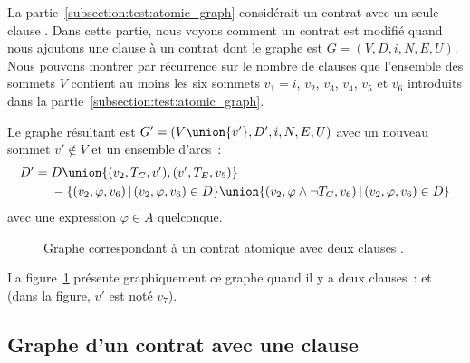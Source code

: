 La partie~\ref{subsection:test:atomic_graph} considérait un contrat avec un
seule clause \athrowable. Dans cette partie, nous voyons comment un contrat est
modifié quand nous ajoutons une clause  à un
contrat dont le graphe est $G = (V, D, i, N, E, U)$. Nous pouvons montrer par
récurrence sur le nombre de clauses \athrowable que l'ensemble des sommets $V$
contient au moins les six sommets $v_1 = i$, $v_2$, $v_3$, $v_4$, $v_5$ et $v_6$
introduits dans la partie~\ref{subsection:test:atomic_graph}.

Le graphe résultant est $G' = (V \union \{v'\}, D', i, N, E, U)$ avec un nouveau
sommet $v' \notin V$ et un ensemble d'arcs~:
%
\begin{align*}
%
D' =\;
  & D \union \{(v_2, T_C, v'), (v', T_E, v_5)\} \\
  & - \{(v_2, \varphi, v_6) \,\vert\, (v_2, \varphi, v_6) \in D\} \union
      \{(v_2, \varphi \land \neg T_C, v_6) \,\vert\, (v_2, \varphi, v_6) \in D\}
%
\end{align*}
%
avec une expression $\varphi \in A$ quelconque.

\begin{figure}


\caption{\label{figure:test:throwable_graph} Graphe correspondant à un contrat
atomique avec deux clauses \athrowable.}

\end{figure}

\begin{example}

La figure~\ref{figure:test:throwable_graph} présente graphiquement ce graphe
quand il y a deux clauses~:  et
 (dans la figure, $v'$ est noté
$v_7$).

\end{example}

\subsection{Graphe d'un contrat avec une clause \abehavior}
\label{subsection:test:behavior_graph}

